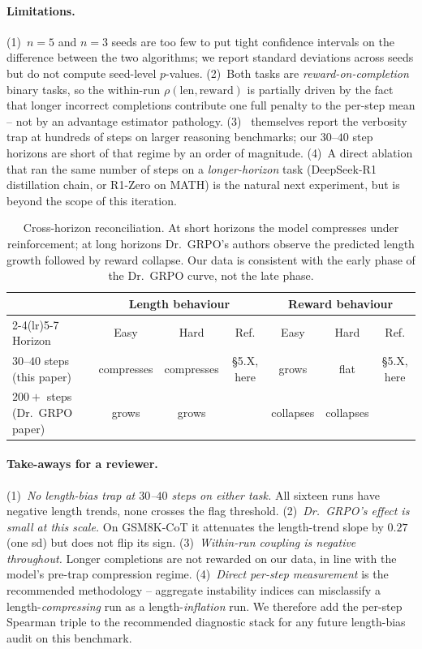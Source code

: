 \documentclass{article}
\begin{document}
\paragraph{Limitations.}
(1)~$n{=}5$ and $n{=}3$ seeds are too few to put tight confidence
intervals on the difference between the two algorithms; we report
standard deviations across seeds but do not compute seed-level
$p$-values. (2)~Both tasks are \emph{reward-on-completion}
binary tasks, so the within-run $\rho(\text{len},\text{reward})$
is partially driven by the fact that longer incorrect completions
contribute one full penalty to the per-step mean -- not by an
advantage estimator pathology. (3)~\cite{tong2025drgrpo} themselves
report the verbosity trap at hundreds of steps on larger
reasoning benchmarks; our $30$--$40$ step horizons are short of
that regime by an order of magnitude. (4)~A direct ablation that
ran the same number of steps on a \emph{longer-horizon} task
(DeepSeek-R1 distillation chain, or R1-Zero on MATH) is the
natural next experiment, but is beyond the scope of this
iteration.

\begin{table}[htbp]
\centering
\small
\begin{tabular}{lcccccc}
\toprule
& \multicolumn{3}{c}{Length behaviour} & \multicolumn{3}{c}{Reward behaviour} \\
\cmidrule(lr){2-4}\cmidrule(lr){5-7}
Horizon & Easy & Hard & Ref. & Easy & Hard & Ref. \\
\midrule
$30$--$40$ steps (this paper)         & compresses & compresses & §5.X, here & grows    & flat    & §5.X, here \\
$200{+}$ steps (Dr.~GRPO paper)        & grows      & grows      & \cite{tong2025drgrpo} & collapses & collapses & \cite{tong2025drgrpo} \\
\bottomrule
\end{tabular}
\caption{Cross-horizon reconciliation. At short horizons the model compresses under
reinforcement; at long horizons Dr.~GRPO's authors observe the predicted length growth
followed by reward collapse. Our data is consistent with the early phase of the
Dr.~GRPO curve, not the late phase.}
\label{tab:length-bias-horizon}
\end{table}

\paragraph{Take-aways for a reviewer.}
(1)~\emph{No length-bias trap at $30$--$40$ steps on either task.}
All sixteen runs have negative length trends, none crosses the
flag threshold. (2)~\emph{Dr.~GRPO's effect is small at this scale.}
On GSM8K-CoT it attenuates the length-trend slope by $0.27$ (one
sd) but does not flip its sign. (3)~\emph{Within-run coupling is
negative throughout.} Longer completions are not rewarded on our
data, in line with the model's pre-trap compression regime.
(4)~\emph{Direct per-step measurement} is the recommended
methodology -- aggregate instability indices can misclassify a
length-\emph{compressing} run as a length-\emph{inflation} run.
We therefore add the per-step Spearman triple to the recommended
diagnostic stack for any future length-bias audit on this benchmark.
\end{document}
